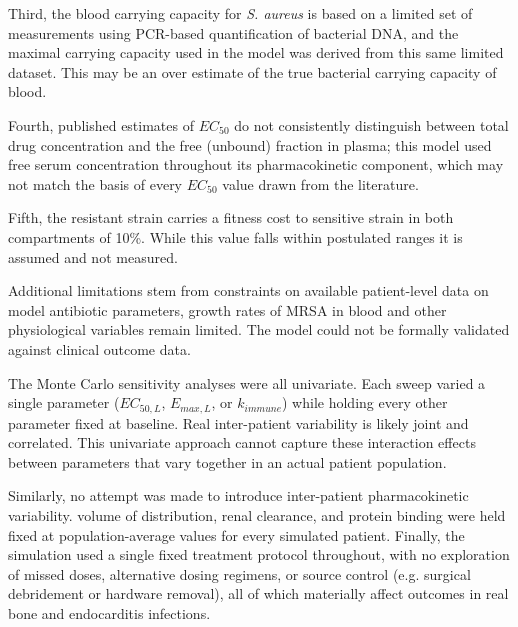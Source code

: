 \documentclass[12pt, draftcls, onecolumn]{IEEEtran}
\begin{document}
Third, the blood carrying capacity for \textit{S. aureus} is based on a
limited set of measurements using PCR-based quantification of bacterial
DNA, and the maximal carrying capacity used in the model was derived from
this same limited dataset.  This may be an over estimate of the true bacterial carrying capacity of blood.

Fourth, published estimates of $EC_{50}$ do not consistently distinguish
between total drug concentration and the free (unbound) fraction in
plasma; this model used free serum concentration throughout its
pharmacokinetic component, which may not match the basis of every $EC_{50}$
value drawn from the literature.

Fifth, the resistant strain carries a fitness cost to sensitive strain in both compartments of
10\%. While this value falls within postulated ranges it is assumed and not measured. 

Additional limitations stem from constraints on available patient-level
data on model antibiotic parameters, growth rates of
MRSA in blood and other physiological variables remain limited.  The
model could not be formally validated against clinical outcome data. 

The Monte Carlo sensitivity analyses were all univariate. Each sweep varied
a single parameter ($EC_{50,L}$, $E_{max,L}$, or $k_{immune}$) while
holding every other parameter fixed at baseline. Real
inter-patient variability is likely joint and correlated.  This univariate approach cannot capture
these interaction effects between parameters that vary together in an actual
patient population. 

Similarly, no attempt was made to introduce
inter-patient pharmacokinetic variability.  volume of distribution,
renal clearance, and protein binding were held fixed at population-average
values for every simulated patient. Finally, the simulation
used a single fixed treatment protocol throughout, with no exploration
of missed doses, alternative dosing regimens, or source control (e.g. 
surgical debridement or hardware removal), all of which materially
affect outcomes in real bone and endocarditis infections.





\end{document}
